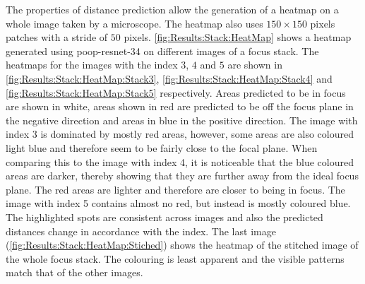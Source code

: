 The properties of distance prediction allow the generation of a heatmap on a whole image taken by a microscope. The heatmap also uses $150 \times 150$ pixels patches with a stride of $50$ pixels. \autoref{fig:Results:Stack:HeatMap} shows a heatmap generated using \acs{poop}-\acs{resnet}-34 on different images of a focus stack. The heatmaps for the images with the index $3$, $4$ and $5$ are shown in \autoref{fig:Results:Stack:HeatMap:Stack3}, \autoref{fig:Results:Stack:HeatMap:Stack4} and \autoref{fig:Results:Stack:HeatMap:Stack5} respectively. Areas predicted to be in focus are shown in white, areas shown in red are predicted to be off the focus plane in the negative direction and areas in blue in the positive direction. The image with index 3 is dominated by mostly red areas, however, some areas are also coloured light blue and therefore seem to be fairly close to the focal plane. When comparing this to the image with index 4, it is noticeable that the blue coloured areas are darker, thereby showing that they are further away from the ideal focus plane. The red areas are lighter and therefore are closer to being in focus. The image with index 5 contains almost no red, but instead is mostly coloured blue. The highlighted spots are consistent across images and also the predicted distances change in accordance with the index. The last image (\autoref{fig:Results:Stack:HeatMap:Stiched}) shows the heatmap of the stitched image of the whole focus stack. The colouring is least apparent and the visible patterns match that of the other images.

